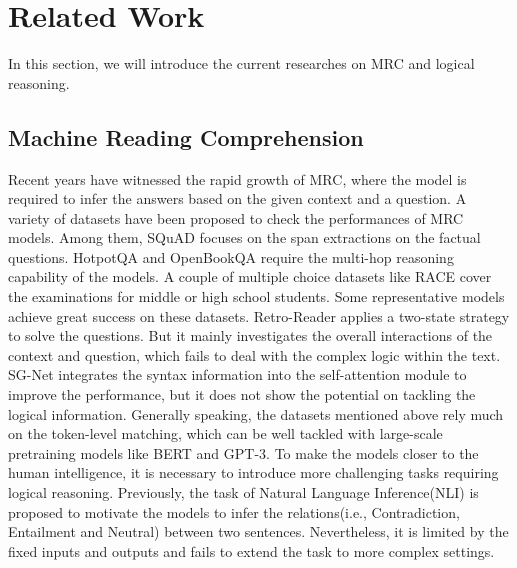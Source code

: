 \documentclass[sigconf]{acmart}
\begin{document}
\section{Related Work}
In this section, we will introduce the current researches on MRC and logical reasoning.
\vspace{-0.2cm}
\subsection{Machine Reading Comprehension}
Recent years have witnessed the rapid growth of MRC\cite{liu2019neural}, where the model is required to infer the answers based on the given context and a question. A variety of datasets have been proposed to check the performances of MRC models. Among them, SQuAD\cite{rajpurkar2016squad, rajpurkar2018know} focuses on the span extractions on the factual questions. HotpotQA\cite{yang2018hotpotqa} and OpenBookQA\cite{mihaylov2018can} require the multi-hop reasoning capability of the models. A couple of multiple choice datasets like RACE\cite{lai2017race} cover the examinations for middle or high school students. Some representative models achieve great success on these datasets. Retro-Reader \cite{zhang2021retrospective} applies a two-state strategy to solve the questions. But it mainly investigates the overall interactions of the context and question, which fails to deal with the complex logic within the text. SG-Net \cite{zhang2020sg} integrates the syntax information into the self-attention module to improve the performance, but it does not show the potential on tackling the logical information. Generally speaking, the datasets mentioned above rely much on the token-level matching, which can be well tackled with large-scale pretraining models like BERT\cite{devlin2018bert} and GPT-3\cite{brown2020language}. To make the models closer to the human intelligence, it is necessary to introduce more challenging tasks requiring logical reasoning. Previously, the task of Natural Language Inference(NLI)\cite{bowman2015large, storks2019recent} is proposed to motivate the models to infer the relations(i.e., Contradiction, Entailment and Neutral) between two sentences. Nevertheless, it is limited by the fixed inputs and outputs and fails to extend the task to more complex settings.
\end{document}
